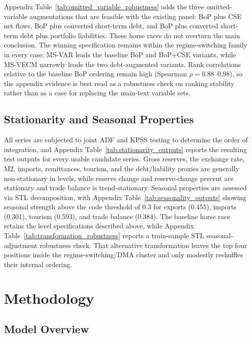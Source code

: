 \documentclass[12pt,a4paper]{article}
\begin{document}
Appendix Table~\ref{tab:omitted_variable_robustness} adds the three omitted-variable augmentations that are feasible with the existing panel: BoP plus CSE net flows, BoP plus converted short-term debt, and BoP plus converted short-term debt plus portfolio liabilities. These horse races do not overturn the main conclusion. The winning specification remains within the regime-switching family in every case: MS-VAR leads the baseline BoP and BoP+CSE variants, while MS-VECM narrowly leads the two debt-augmented variants. Rank correlations relative to the baseline BoP ordering remain high (Spearman $\rho = 0.88$--$0.98$), so the appendix evidence is best read as a robustness check on ranking stability rather than as a case for replacing the main-text variable sets.

\subsection{Stationarity and Seasonal Properties}

All series are subjected to joint ADF and KPSS testing to determine the order of integration, and Appendix Table~\ref{tab:stationarity_outputs} reports the resulting test outputs for every usable candidate series. Gross reserves, the exchange rate, M2, imports, remittances, tourism, and the debt/liability proxies are generally non-stationary in levels, while reserve change and reserve-change percent are stationary and trade balance is trend-stationary. Seasonal properties are assessed via STL decomposition, with Appendix Table~\ref{tab:seasonality_outputs} showing seasonal strength above the code threshold of 0.3 for exports (0.455), imports (0.301), tourism (0.593), and trade balance (0.384). The baseline horse race retains the level specifications described above, while Appendix Table~\ref{tab:transformation_robustness} reports a train-sample STL seasonal-adjustment robustness check. That alternative transformation leaves the top four positions inside the regime-switching/DMA cluster and only modestly reshuffles their internal ordering.

\section{Methodology}

\subsection{Model Overview}
\end{document}
